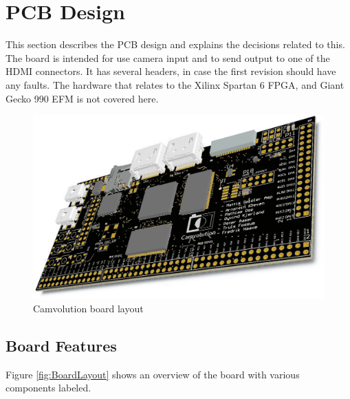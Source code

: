 \section{PCB Design}
This section describes the PCB design and explains the decisions related to this.
The board is intended for use camera input and to send output to one of the HDMI connectors.
It has several headers, in case the first revision should have any faults.
The hardware that relates to the Xilinx Spartan 6 FPGA, and Giant Gecko 990 EFM is not covered here.

\begin{figure}[h]
    \includegraphics[width=\linewidth]{img/OverviewCamvolutionKit}
    \caption{Camvolution board layout}
\end{figure}

\subsection{Board Features}
Figure \ref{fig:BoardLayout} shows an overview of the board with various components labeled.


